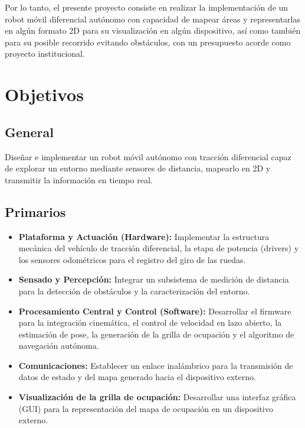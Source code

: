 Por lo tanto, el presente proyecto consiste en realizar la implementación de un robot móvil diferencial autónomo con capacidad de mapear áreas y representarlas en algún formato 2D para su visualización en algún dispositivo, así como también para su posible recorrido evitando obstáculos, con un presupuesto acorde como proyecto institucional.

\newpage

\section{Objetivos}

\subsection{General}
Diseñar e implementar un robot móvil autónomo con tracción diferencial capaz de explorar un entorno mediante sensores de distancia, mapearlo en 2D y transmitir la información en tiempo real.

\subsection{Primarios}
\begin{itemize}
    \item \textbf{Plataforma y Actuación (Hardware):} Implementar la estructura mecánica del vehículo de tracción diferencial, la etapa de potencia (drivers) y los sensores odométricos para el registro del giro de las ruedas.
    \item \textbf{Sensado y Percepción:} Integrar un subsistema de medición de distancia para la detección de obstáculos y la caracterización del entorno.
    \item \textbf{Procesamiento Central y Control (Software):} Desarrollar el firmware para la integración cinemática, el control de velocidad en lazo abierto, la estimación de pose, la generación de la grilla de ocupación y el algoritmo de navegación autónoma.
    \item \textbf{Comunicaciones:} Establecer un enlace inalámbrico para la transmisión de datos de estado y del mapa generado hacia el dispositivo externo.
    \item \textbf{Visualización de la grilla de ocupación:} Desarrollar una interfaz gráfica (GUI) para la representación del mapa de ocupación en un dispositivo externo.
\end{itemize}


